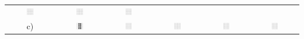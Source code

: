 \begin{tabular}{cccccc}
\includegraphics[width=0.15\textwidth]{./inf/SEKII/18_Java_Arrays/GoL.png} &
\includegraphics[width=0.15\textwidth]{./inf/SEKII/18_Java_Arrays/GoL.png} &
\includegraphics[width=0.15\textwidth]{./inf/SEKII/18_Java_Arrays/GoL.png} \\
c) &
\includegraphics[width=0.15\textwidth]{./inf/SEKII/18_Java_Arrays/GoL4.png} &
\includegraphics[width=0.15\textwidth]{./inf/SEKII/18_Java_Arrays/GoL.png} &
\includegraphics[width=0.15\textwidth]{./inf/SEKII/18_Java_Arrays/GoL.png} &
\includegraphics[width=0.15\textwidth]{./inf/SEKII/18_Java_Arrays/GoL.png} &
\includegraphics[width=0.15\textwidth]{./inf/SEKII/18_Java_Arrays/GoL.png} \\

\end{tabular}
